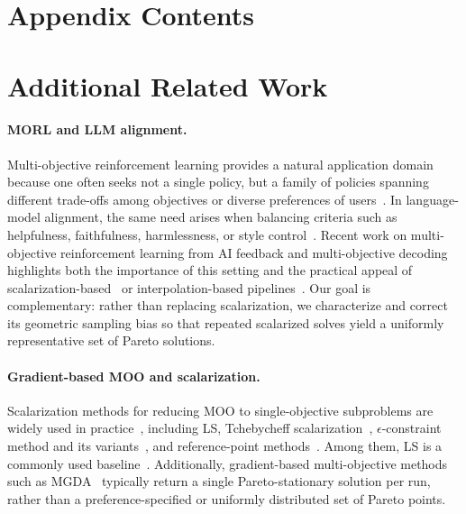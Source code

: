 \documentclass{article}
\begin{document}
\section*{Appendix Contents}
\label{app:contents}
\vspace{-0.5em}


\vspace{0.5em}


\section{Additional Related Work}
\label{app:related_work}
\paragraph{MORL and LLM alignment.}
Multi-objective reinforcement learning provides a natural application domain because one often seeks not a single policy, but a family of policies spanning different trade-offs among objectives or diverse preferences of users~\citep{reymond2022pareto,felten2024multi,lin2024policy}. In language-model alignment, the same need arises when balancing criteria such as helpfulness, faithfulness, harmlessness, or style control~\citep{shi2024decoding,yang2024metaaligner,guo2024controllable,shen2025simultaneous}. Recent work on multi-objective reinforcement learning from AI feedback and multi-objective decoding highlights both the importance of this setting and the practical appeal of scalarization-based~\citep{qiu2024traversing,zhou2024beyond,williams2024multi,wang2024conditional,li2025gradient} or interpolation-based pipelines~\citep{rame2023rewarded,shi2024decoding,li2025multi,lin2025parm}. Our goal is complementary: rather than replacing scalarization, we characterize and correct its geometric sampling bias so that repeated scalarized solves yield a uniformly representative set of Pareto solutions.



\paragraph{Gradient-based MOO and scalarization.}
Scalarization methods for reducing MOO to single-objective subproblems are widely used in practice~\cite{marler2010weighted}, including LS, Tchebycheff scalarization~\citep{jahn1985scalarization,lin2024smooth}, $\epsilon$-constraint method and its variants~\citep{chankong2008multiobjective,momma2022multi,mahapatra2020multi,ye2022pareto,chen2024pareto,roy2023optimization,chen2025foops},  and reference-point methods~\citep{wierzbicki1998reference}. Among them, LS is a commonly used baseline~\citep{zhou2024beyond,yang2024learning,zhang2024optimal,chen2025gradient_moo_review}. Additionally, gradient-based multi-objective methods such as MGDA~\citep{sener2018multi,liu2021conflict,liu2021stochastic,zhou2022_SMOO,fernando2022mitigating,chen2023three,xiao2023direction} typically return a single Pareto-stationary solution per run, rather than a preference-specified or uniformly distributed set of Pareto points.
\end{document}
